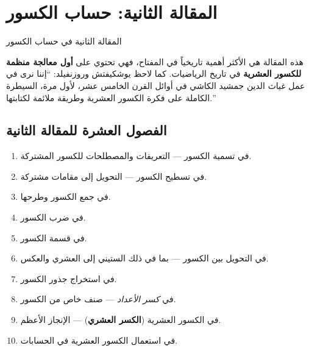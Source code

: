 \documentclass[11pt,a4paper]{book}
\newcommand{\ar}[1]{\arabicfont\beginR #1\endR}
\newcommand{\arHuge}[1]{{\Huge\arabicfont\beginR #1\endR}}
\newenvironment{arabicbox}{%
  \begin{framed}
  \begin{minipage}{\linewidth-2\fboxsep-2\fboxrule}
  \setlength{\parindent}{0pt}
  \linespread{1.3}\selectfont
}{%
  \end{minipage}
  \end{framed}
}
\begin{document}
\chapter{\ar{المقالة الثانية: حساب الكسور}}
\label{ch:treatise2}

\begin{arabicbox}
\begin{center}
\arHuge{المقالة الثانية في حساب الكسور}
\end{center}
\end{arabicbox}

\vspace{0.5cm}

\noindent\ar{هذه المقالة هي الأكثر أهمية تاريخياً في المفتاح، فهي تحتوي على \textbf{أول معالجة منظمة للكسور العشرية} في تاريخ الرياضيات. كما لاحظ يوشكيفتش وروزنفيلد: ``إننا نرى في عمل غياث الدين جمشيد الكاشي في أوائل القرن الخامس عشر، لأول مرة، السيطرة الكاملة على فكرة الكسور العشرية وطريقة ملائمة لكتابتها.''}

\section{\ar{الفصول العشرة للمقالة الثانية}}

\begin{enumerate}[label=\textbf{\ar{فصل} \arabic*:}]
  \item \ar{في تسمية الكسور — التعريفات والمصطلحات للكسور المشتركة.}
  \item \ar{في تسطيح الكسور — التحويل إلى مقامات مشتركة.}
  \item \ar{في جمع الكسور وطرحها.}
  \item \ar{في ضرب الكسور.}
  \item \ar{في قسمة الكسور.}
  \item \ar{في التحويل بين الكسور — بما في ذلك الستيني إلى العشري والعكس.}
  \item \ar{في استخراج جذور الكسور.}
  \item \ar{في \textit{كسر الأعداد} — صنف خاص من الكسور.}
  \item \ar{في الكسور العشرية (\textbf{الكسر العشري}) — الإنجاز الأعظم.}
  \item \ar{في استعمال الكسور العشرية في الحسابات.}
\end{enumerate}

\end{document}
